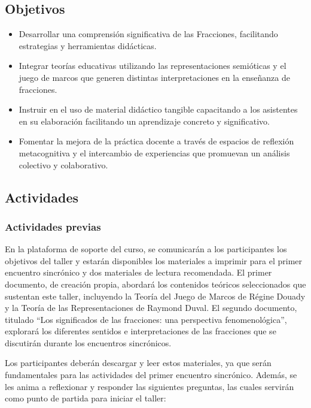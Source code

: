 \subsection{Objetivos}

\begin{itemize}
	\item Desarrollar una comprensión significativa de las Fracciones, facilitando estrategias y herramientas didácticas.
	\item Integrar teorías educativas utilizando las representaciones semióticas y el juego de marcos que generen distintas interpretaciones en la enseñanza de fracciones.
	\item Instruir en el uso de material didáctico tangible capacitando a los asistentes en su elaboración facilitando un aprendizaje concreto y significativo.
	\item Fomentar la mejora de la práctica docente a través de espacios de reflexión metacognitiva y el intercambio de experiencias que promuevan un análisis colectivo y colaborativo.
\end{itemize}

\subsection{Actividades}

\subsubsection{Actividades previas}

En la plataforma de soporte del curso, se comunicarán a los participantes los objetivos del taller y estarán disponibles los materiales a imprimir para el primer encuentro sincrónico y dos materiales de lectura recomendada. El primer documento, de creación propia, abordará los contenidos teóricos seleccionados que sustentan este taller, incluyendo la Teoría del Juego de Marcos de Régine Douady y la Teoría de las Representaciones de Raymond Duval. El segundo documento, titulado “Los significados de las fracciones: una perspectiva fenomenológica”, explorará los diferentes sentidos e interpretaciones de las fracciones que se discutirán durante los encuentros sincrónicos.

Los participantes deberán descargar y leer estos materiales, ya que serán fundamentales para las actividades del primer encuentro sincrónico. Además, se les anima a reflexionar y responder las siguientes preguntas, las cuales servirán como punto de partida para iniciar el taller:

